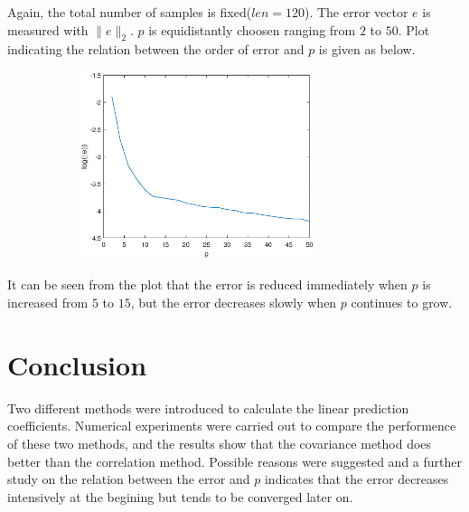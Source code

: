 \documentclass[preprint,12pt]{elsarticle}
\begin{document}
Again, the total number of samples is fixed($len = 120$). The error vector $e$ is measured with $\lVert e \rVert_2$. $p$ is equidistantly choosen ranging from $2$ to $50$. Plot indicating the relation between the order of error and $p$ is given as below.

\begin{figure}[!h]
	\centering
	\includegraphics[height=5.5cm,width=9cm]{../pic/err_vs_p.eps}
\end{figure}

It can be seen from the plot that the error is reduced immediately when $p$ is increased from $5$ to $15$, but the error decreases slowly when $p$ continues to grow.

\section{Conclusion}
Two different methods were introduced to calculate the linear prediction coefficients. Numerical experiments were carried out to compare the performence of these two methods, and the results show that the covariance method
does better than the correlation method. Possible reasons were suggested and a further study on the relation between the error and $p$ indicates that the error decreases intensively at the begining but tends to be converged later on.





\end{document}
